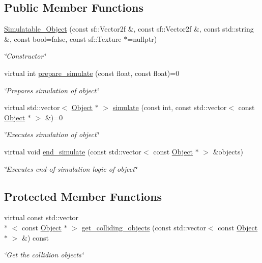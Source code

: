 \subsection*{Public Member Functions}
\begin{DoxyCompactItemize}
\item 
\hyperlink{classSimulatable__Object_a0ca1611db5809ac78440a862ba986af7}{Simulatable\+\_\+\+Object} (const sf\+::\+Vector2f \&, const sf\+::\+Vector2f \&, const std\+::string \&, const bool=false, const sf\+::\+Texture $\ast$=nullptr)
\begin{DoxyCompactList}\small\item\em \char`\"{}\+Constructor\char`\"{} \end{DoxyCompactList}\item 
virtual int \hyperlink{classSimulatable__Object_abe7c02fe250ef5be42011890d8a7b37b}{prepare\+\_\+simulate} (const float, const float)=0
\begin{DoxyCompactList}\small\item\em \char`\"{}\+Prepares simulation of object\char`\"{} \end{DoxyCompactList}\item 
virtual std\+::vector$<$ \hyperlink{classObject}{Object} $\ast$ $>$ \hyperlink{classSimulatable__Object_a60fb2da770367330360a90afc7b724f1}{simulate} (const int, const std\+::vector$<$ const \hyperlink{classObject}{Object} $\ast$ $>$ \&)=0
\begin{DoxyCompactList}\small\item\em \char`\"{}\+Executes simulation of object\char`\"{} \end{DoxyCompactList}\item 
virtual void \hyperlink{classSimulatable__Object_a1c542c4d9cb7ba923ea9f974e5f03e84}{end\+\_\+simulate} (const std\+::vector$<$ const \hyperlink{classObject}{Object} $\ast$ $>$ \&objects)
\begin{DoxyCompactList}\small\item\em \char`\"{}\+Executes end-\/of-\/simulation logic of object\char`\"{} \end{DoxyCompactList}\end{DoxyCompactItemize}
\subsection*{Protected Member Functions}
\begin{DoxyCompactItemize}
\item 
virtual const std\+::vector\\*
$<$ const \hyperlink{classObject}{Object} $\ast$ $>$ \hyperlink{classSimulatable__Object_a2d7252861e8dea6b3bb9909421b88766}{get\+\_\+colliding\+\_\+objects} (const std\+::vector$<$ const \hyperlink{classObject}{Object} $\ast$ $>$ \&) const 
\begin{DoxyCompactList}\small\item\em \char`\"{}\+Get the collidion objects\char`\"{} \end{DoxyCompactList}\end{DoxyCompactItemize}
